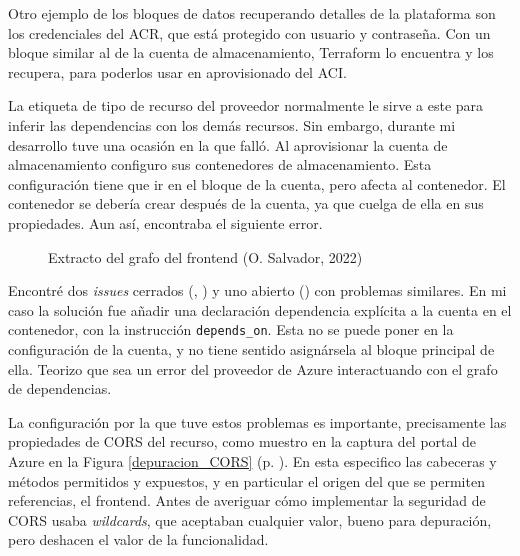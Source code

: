 \documentclass[11pt]{article}
\begin{document}
\begin{flushleft}
	Otro ejemplo de los bloques de datos recuperando detalles de la plataforma son los credenciales del ACR, que está protegido con usuario y contraseña. Con un bloque similar al de la cuenta de almacenamiento, Terraform lo encuentra y los recupera, para poderlos usar en aprovisionado del ACI.
	\linebreak
	
	La etiqueta de tipo de recurso del proveedor normalmente le sirve a este para inferir las dependencias con los demás recursos. Sin embargo, durante mi desarrollo tuve una ocasión en la que falló. Al aprovisionar la cuenta de almacenamiento configuro sus contenedores de almacenamiento. Esta configuración tiene que ir en el bloque de la cuenta, pero afecta al contenedor. El contenedor se debería crear después de la cuenta, ya que cuelga de ella en sus propiedades. Aun así, encontraba el siguiente error.
	\linebreak
	
		\begin{figure}[htb]
			\centering
			\caption{Extracto del grafo del frontend (O. Salvador, 2022)}
		\end{figure}
		
		
	Encontré dos \textit{issues} cerrados (\cite{tf_depends3}, \cite{tf_depends2}) y uno abierto (\cite{tf_depends1}) con problemas similares. En mi caso la solución fue añadir una declaración dependencia explícita a la cuenta en el contenedor, con la instrucción \texttt{depends\_on}. Esta no se puede poner en la configuración de la cuenta, y no tiene sentido asignársela al bloque principal de ella. Teorizo que sea un error del proveedor de Azure interactuando con el grafo de dependencias.
	\linebreak
	
	La configuración por la que tuve estos problemas es importante, precisamente las propiedades de CORS del recurso, como muestro en la captura del portal de Azure en la Figura \ref{depuracion_CORS} (p. \pageref{depuracion_CORS}). En esta especifico las cabeceras y métodos permitidos y expuestos, y en particular el origen del que se permiten referencias, el frontend. Antes de averiguar cómo implementar la seguridad de CORS usaba \textit{\gls{wildcard}s}, que aceptaban cualquier valor, bueno para depuración, pero deshacen el valor de la funcionalidad.
	\linebreak
	

\end{flushleft}
\end{document}
